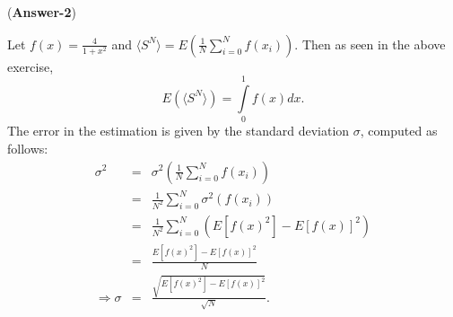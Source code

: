 \documentclass[11pt,twoside,reqno]{article}
\newcommand{\s}{\sigma}
\begin{document}
({\bf Answer-2})

Let $f(x) = \frac{4}{1+x^2}$ and $\langle S^N \rangle = E(\frac{1}{N}\sum\limits_{i=0}^{N} f(x_i))$. Then as seen in the above exercise, 
\[
E(\langle S^N \rangle) = \int\limits_{0}^1 f(x)dx.
\]
The error in the estimation is given by the standard deviation $\s$, computed as follows:
\begin{eqnarray*}
\s^2 &=& \s^2 \left( \frac{1}{N}\sum\limits_{i=0}^{N} f(x_i) \right)\\
&=& \frac{1}{N^2} \sum\limits_{i=0}^{N} \s^2(f(x_i)) \\
&=& \frac{1}{N^2} \sum\limits_{i=0}^{N} (E[f(x)^2] - E[f(x)]^2)  \\
&=&\frac{E[f(x)^2] - E[f(x)]^2}{N} \\
\Rightarrow \s &=& \frac{\sqrt{E[f(x)^2] - E[f(x)]^2}}{\sqrt{N}}.
\end{eqnarray*}
\end{document}
